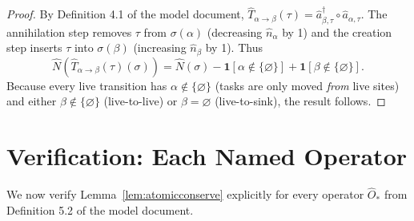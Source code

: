 \documentclass[11pt,a4paper]{report}
\newcommand{\cre}[1]{\hat{a}^{\dagger}_{#1}}
\newcommand{\ann}[1]{\hat{a}_{#1}}
\newcommand{\num}[1]{\hat{n}_{#1}}
\newcommand{\Num}{\hat{N}}
\newcommand{\Trf}[2]{\hat{T}_{#1 \to #2}}
\begin{document}
\begin{proof}
By Definition 4.1 of the model document, $\Trf{\alpha}{\beta}(\tau) =
\cre{\beta,\tau} \circ \ann{\alpha,\tau}$.  The annihilation step
removes $\tau$ from $\sigma(\alpha)$ (decreasing $\num{\alpha}$ by 1)
and the creation step inserts $\tau$ into $\sigma(\beta)$ (increasing
$\num{\beta}$ by 1).  Thus
\[
  \Num(\Trf{\alpha}{\beta}(\tau)(\sigma))
  = \Num(\sigma) - \mathbf{1}[\alpha \notin \{\varnothing\}]
                 + \mathbf{1}[\beta \notin \{\varnothing\}].
\]
Because every live transition has $\alpha \notin \{\varnothing\}$
(tasks are only moved \emph{from} live sites) and either
$\beta \notin \{\varnothing\}$ (live-to-live) or $\beta = \varnothing$
(live-to-sink), the result follows.
\end{proof}

\section{Verification: Each Named Operator}

We now verify Lemma~\ref{lem:atomicconserve} explicitly for every
operator $\hat{O}_*$ from Definition 5.2 of the model document.
\end{document}
